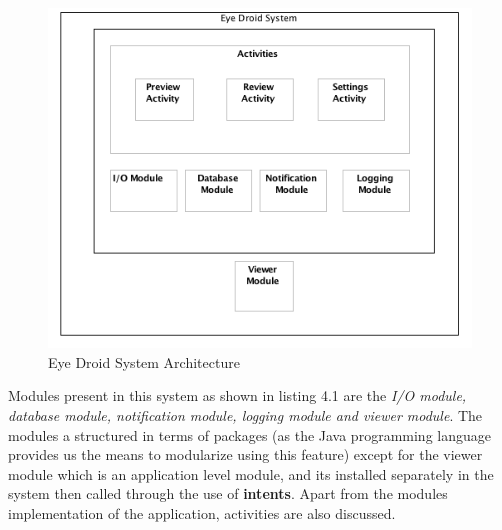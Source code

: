 \begin{figure}[ht!]
\centering
\includegraphics[width=140mm]{eye_arch.png}
\caption{Eye Droid System Architecture}
\label{overflow}
\end{figure}    

Modules present in this system as shown in listing 4.1 are the {\it I/O module, database module, notification module, logging module and viewer module}. The modules a structured in terms of packages (as the Java programming language provides us the means to modularize using this feature) except for the viewer module which is an application level module, and its installed separately in the system then called through the use of {\bf intents}. Apart from the modules implementation of the application, activities are also discussed. 


